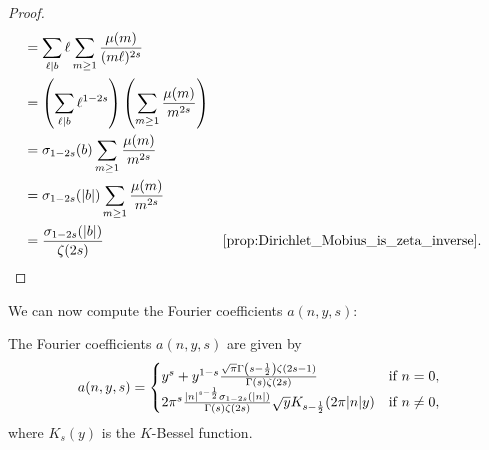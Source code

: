 \begin{proof}
\begin{align*}
          &= \sum_{\ell \mid b}\ell\sum_{m \ge 1}\frac{\mu(m)}{(m\ell)^{2s}} \\
          &= \left(\sum_{\ell \mid b}\ell^{1-2s}\right)\left(\sum_{m \ge 1}\frac{\mu(m)}{m^{2s}}\right) \\
          &= \s_{1-2s}(b)\sum_{m \ge 1}\frac{\mu(m)}{m^{2s}} \\
          &= \s_{1-2s}(|b|)\sum_{m \ge 1}\frac{\mu(m)}{m^{2s}} \\
          &= \frac{\s_{1-2s}(|b|)}{\z(2s)} && \text{\cref{prop:Dirichlet_Mobius_is_zeta_inverse}}.
        \end{align*}
      \end{proof}

      We can now compute the Fourier coefficients $a(n,y,s)$:

      \begin{proposition}\label{prop:Fourier_coefficients_of_real-analytic_Eisenstein_series}
        The Fourier coefficients $a(n,y,s)$ are given by
        \[
          a(n,y,s) = \begin{cases} y^{s}+y^{1-s}\frac{\sqrt{\pi}\Gamma\left(s-\frac{1}{2}\right)\zeta(2s-1)}{\Gamma(s)\zeta(2s)} & \text{if $n = 0$}, \\ 2\pi^{s}\frac{|n|^{s-\frac{1}{2}}\sigma_{1-2s}(|n|)}{\Gamma(s)\zeta(2s)}\sqrt{y}K_{s-\frac{1}{2}}(2\pi|n|y) & \text{if $n \neq 0$}, \end{cases}
        \]
        where $K_{s}(y)$ is the $K$-Bessel function.
      \end{proposition}
